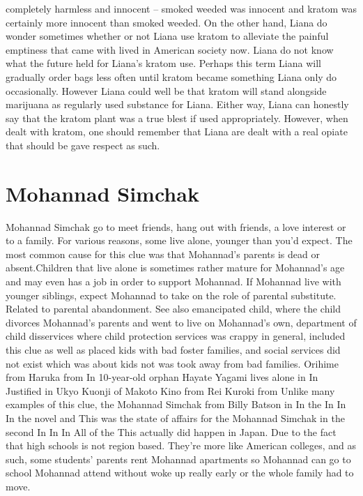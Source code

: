 \documentclass[12pt]{book}
\begin{document}
completely harmless and innocent -- smoked weeded was innocent and kratom was certainly more innocent than smoked weeded. On the other hand, Liana do wonder sometimes whether or not Liana use kratom to alleviate the painful emptiness that came with lived in American society now. Liana do not know what the future held for Liana's kratom use. Perhaps this term Liana will gradually order bags less often until kratom became something Liana only do occasionally. However Liana could well be that kratom will stand alongside marijuana as regularly used substance for Liana. Either way, Liana can honestly say that the kratom plant was a true blest if used appropriately. However, when dealt with kratom, one should remember that Liana are dealt with a real opiate that should be gave respect as such.



\chapter{Mohannad Simchak}

Mohannad Simchak go to meet friends, hang out with friends, a love interest or to a family. For various reasons, some live alone, younger than you'd expect. The most common cause for this clue was that Mohannad's parents is dead or absent.Children that live alone is sometimes rather mature for Mohannad's age and may even has a job in order to support Mohannad. If Mohannad live with younger siblings, expect Mohannad to take on the role of parental substitute. Related to parental abandonment. See also emancipated child, where the child divorces Mohannad's parents and went to live on Mohannad's own, department of child disservices where child protection services was crappy in general, included this clue as well as placed kids with bad foster families, and social services did not exist which was about kids not was took away from bad families. Orihime from Haruka from In 10-year-old orphan Hayate Yagami lives alone in In Justified in Ukyo Kuonji of Makoto Kino from Rei Kuroki from Unlike many examples of this clue, the Mohannad Simchak from Billy Batson in In the In In In the novel and This was the state of affairs for the Mohannad Simchak in the second In In In All of the This actually did happen in Japan. Due to the fact that high schools is not region based. They're more like American colleges, and as such, some students' parents rent Mohannad apartments so Mohannad can go to school Mohannad attend without woke up really early or the whole family had to move.
\end{document}
